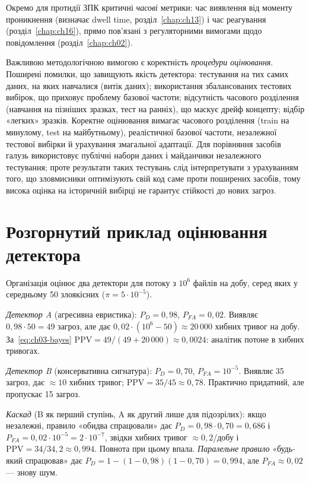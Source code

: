 Окремо для протидії ЗПК критичні \emph{часові} метрики: час виявлення від моменту проникнення (визначає dwell time, розділ~\ref{chap:ch13}) і час реагування (розділ~\ref{chap:ch16}), прямо пов'язані з регуляторними вимогами щодо повідомлення (розділ~\ref{chap:ch02}).

Важливою методологічною вимогою є коректність \emph{процедури оцінювання}. Поширені помилки, що завищують якість детектора: тестування на тих самих даних, на яких навчалися (витік даних); використання збалансованих тестових вибірок, що приховує проблему базової частоти; відсутність часового розділення (навчання на пізніших зразках, тест на ранніх), що маскує дрейф концепту; відбір «легких» зразків. Коректне оцінювання вимагає часового розділення (train на минулому, test на майбутньому), реалістичної базової частоти, незалежної тестової вибірки й урахування змагальної адаптації. Для порівняння засобів галузь використовує публічні набори даних і майданчики незалежного тестування; проте результати таких тестувань слід інтерпретувати з урахуванням того, що зловмисники оптимізують свій код саме проти поширених засобів, тому висока оцінка на історичній вибірці не гарантує стійкості до нових загроз.

\section{Розгорнутий приклад оцінювання детектора}\label{sec:ch03-example}

Організація оцінює два детектори для потоку з $10^6$ файлів на добу, серед яких у середньому 50 злоякісних ($\pi = 5\cdot10^{-5}$).

\emph{Детектор A} (агресивна евристика): $P_D = 0{,}98$, $P_{FA} = 0{,}02$. Виявляє $0{,}98\cdot50 = 49$ загроз, але дає $0{,}02\cdot(10^6-50) \approx 20\,000$ хибних тривог на добу. За~\eqref{eq:ch03-bayes} $\mathrm{PPV} = 49/(49+20\,000) \approx 0{,}0024$: аналітик потоне в хибних тривогах.

\emph{Детектор B} (консервативна сигнатура): $P_D = 0{,}70$, $P_{FA} = 10^{-5}$. Виявляє 35 загроз, дає $\approx 10$ хибних тривог; $\mathrm{PPV} = 35/45 \approx 0{,}78$. Практично придатний, але пропускає 15 загроз.

\emph{Каскад} (B як перший ступінь, A як другий лише для підозрілих): якщо незалежні, правило «обидва спрацювали» дає $P_D = 0{,}98\cdot0{,}70 = 0{,}686$ і $P_{FA} = 0{,}02\cdot10^{-5} = 2\cdot10^{-7}$, звідки хибних тривог $\approx 0{,}2$/добу і $\mathrm{PPV} = 34/34{,}2 \approx 0{,}994$. Повнота при цьому впала. \emph{Паралельне правило} «будь-який спрацював» дає $P_D = 1-(1-0{,}98)(1-0{,}70) = 0{,}994$, але $P_{FA} \approx 0{,}02$ --- знову шум.

